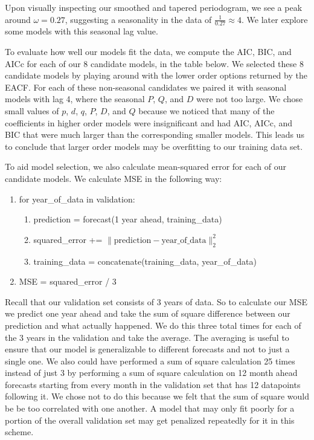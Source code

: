 \documentclass[11pt]{paper}
\begin{document}
Upon visually inspecting our smoothed and tapered periodogram, we see a peak around $\omega = 0.27$, suggesting a seasonality in the data of $\frac{1}{0.27} \approx 4$. We later explore some models with this seasonal lag value.


To evaluate how well our models fit the data, we compute the AIC, BIC, and AICc for each of our 8 candidate models, in the table below. We selected these 8 candidate models by playing around with the lower order options returned by the EACF. For each of these non-seasonal candidates we paired it with seasonal models with lag 4, where the seasonal $P$, $Q$, and $D$ were not too large. We chose small values of $p$, $d$, $q$, $P$, $D$, and $Q$ because we noticed that many of the coefficients in higher order models were insignificant and had AIC, AICc, and BIC that were much larger than the corresponding smaller models. This leads us to conclude that larger order models may be overfitting to our training data set.


To aid model selection, we also calculate mean-squared error for each of our candidate models. We calculate MSE in the following way:

\begin{algo}
\begin{enumerate}
    \item for year_of_data in validation:
    \begin{enumerate}
        \item prediction = forecast(1 year ahead, training_data)
        \item squared_error += $\| \text{prediction} - \text{year_of_data}\|_2^2$
        \item training_data = concatenate(training_data, year_of_data)
    \end{enumerate}
    \item MSE = squared_error / 3
\end{enumerate}
\end{algo}

Recall that our validation set consists of 3 years of data. So to calculate our MSE we predict one year ahead and take the sum of square difference between our prediction and what actually happened. We do this three total times for each of the 3 years in the validation and take the average. The averaging is useful to ensure that our model is generalizable to different forecasts and not to just a single one. We also could have performed a sum of square calculation 25 times instead of just 3 by performing a sum of square calculation on 12 month ahead forecasts starting from every month in the validation set that has 12 datapoints following it. We chose not to do this because we felt that the sum of square would be be too correlated with one another. A model that may only fit poorly for a portion of the overall validation set may get penalized repeatedly for it in this scheme.
\end{document}
